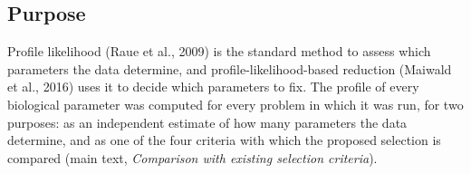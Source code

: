 

\subsection*{Purpose}
Profile likelihood (Raue et al., 2009) is the standard method to assess which parameters the data determine, and profile-likelihood-based reduction (Maiwald et al., 2016) uses it to decide which parameters to fix. The profile of every biological parameter was computed for every problem in which it was run, for two purposes: as an independent estimate of how many parameters the data determine, and as one of the four criteria with which the proposed selection is compared (main text, \emph{Comparison with existing selection criteria}).

